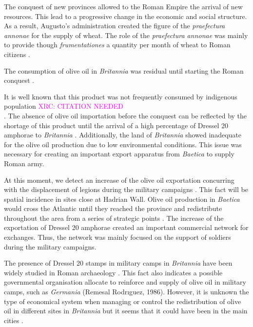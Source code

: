 \documentclass[review]{elsarticle}
\newcommand{\memo}[2]{\textcolor{#1}{#2}}
\newcommand{\xavi}[1]{\memo{magenta}{XRC: #1\\}}
\begin{document}


The conquest of new provinces allowed to the Roman Empire the arrival of new resources. This lead to a progressive change in the economic and social structure. As a result, Augusto's administration created the figure of the \textit{praefectura annonae} for the supply of wheat. The role of the \textit{praefectura annonae} was mainly to provide though \textit{frumentationes} a quantity per month of wheat to Roman citizens \citep{remesal_annona_1986,remesal_concierto}. 


The consumption of olive oil in \textit{Britannia} was residual until starting the Roman conquest \citep{funari_corpus_1996,
carreras_abastecimiento_2003}.

It is well known that this product was not frequently consumed by indigenous population \xavi{CITATION NEEDED}. The absence of olive oil importation before the conquest can be reflected by the shortage of this product until the arrival of a high percentage of Dressel 20 amphorae to \textit{Britannia} \citep[ 1]{carreras_britannia_1998}. Additionally, the land of \textit{Britannia} showed inadequate for the olive oil production due to low environmental conditions. This issue was necessary for creating an important export apparatus from \textit{Baetica} to supply Roman army.

At this moment, we detect an increase of the olive oil exportation concurring with the displacement of legions during the military campaigns \citep[161]{monfort_britanniaen_1998}. This fact will be spatial incidence in sites close at Hadrian Wall.  
Olive oil production in \textit{Baetica} would cross the Atlantic until they reached the province and redistribute throughout the area from a series of strategic points \citep{carreras_atlantic_2012}. The increase of the exportation of Dressel 20 amphorae created an important commercial network for exchanges. Thus, the network was mainly focused on the support of soldiers during the military campaigns. 

The presence of Dressel 20 stamps in military camps in \textit{Britannia} have been widely studied in Roman archaeology \citep{carreras_britannia_1998}. This fact also indicates a possible governmental organisation allocate to reinforce and supply of olive oil in military camps, such as \textit{Germania} (Remesal Rodrıguez, 1986). However, it is unknown the type of economical system when managing or control the redistribution of olive oil in different sites in \textit{Britannia} but it seems that it could have been in the main cities \citep[45]{funari_economic_2005}.
\end{document}
